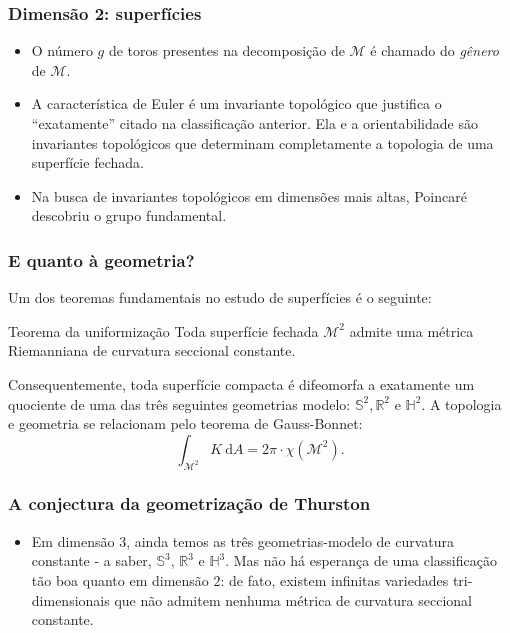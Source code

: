 \documentclass{beamer}
\newcommand{\mm}{\mathcal{M}}
\newcommand{\quotes}[1]{``#1''}
\begin{document}
\begin{frame}
\frametitle{Dimensão 2: superfícies}
\begin{itemize}
\item O número $g$ de toros presentes na decomposição de $\mm$ é chamado do \emph{gênero} de $\mm$.
\item A característica de Euler é um invariante topológico que justifica o \quotes{exatamente} citado na classificação anterior. Ela e a orientabilidade são invariantes topológicos que determinam completamente a topologia de uma superfície fechada. 
\item Na busca de invariantes topológicos em dimensões mais altas, Poincaré descobriu o grupo fundamental.
\end{itemize}


\end{frame}

\begin{frame}
\frametitle{E quanto à geometria?}
Um dos teoremas fundamentais no estudo de superfícies é o seguinte:
\begin{block}{Teorema da uniformização}
Toda superfície fechada $\mm^2$ admite uma métrica Riemanniana de curvatura seccional constante.
\end{block}
Consequentemente, toda superfície compacta é difeomorfa a exatamente um quociente de uma das três seguintes geometrias modelo: $\mathbb{S}^2, \mathbb{R}^2$ e $\mathbb{H}^2$. A topologia e geometria se relacionam pelo teorema de Gauss-Bonnet:
\[
\int_{\mm^2} K \ \mathrm{d} A = 2 \pi \cdot \chi(\mm^2).
\]
\end{frame}

\begin{frame}
\frametitle{A conjectura da geometrização de Thurston}
\begin{itemize}
\item Em dimensão $3$, ainda temos as três geometrias-modelo de curvatura constante - a saber, $\mathbb{S}^3$, $\mathbb{R}^3$ e $\mathbb{H}^3$. Mas não há esperança de uma classificação tão boa quanto em dimensão $2$: de fato, existem infinitas variedades tri-dimensionais que não admitem nenhuma métrica de curvatura seccional constante.
\end{itemize}
\end{frame}
\end{document}
